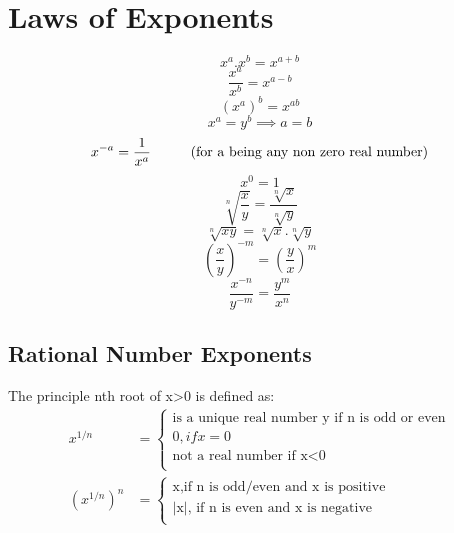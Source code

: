 \section{Laws of Exponents}
\begin{equation}
\label{xmn}
x^a . x^b  = x^{a+b}
\end{equation}
\begin{equation}
\label{xm/n}
\frac{x^a}{x^b}  = x^{a-b}
\end{equation}
\begin{equation}
\label{x^mn}
({x^a})^{b} = x^{ab}
\end{equation}
\begin{equation}
\label{xm_equal_xn}
x^a = y^b \implies a = b
\end{equation}
\begin{equation}
\label{xtominusn}
x^{-a} = \frac{1}{x^a} \hspace{10mm} 
\text{(for a being any non zero real number)}
\end{equation}
\begin{equation}
\label{xto0}
x^{0} = 1
\end{equation}
\begin{equation}
\label{nrootxy}
\sqrt[n]{\frac{x}{y}} = \frac{\sqrt[n]{x}}{\sqrt[n]{y}}
\end{equation}
\begin{equation}
\label{nxy}
\sqrt[n]{xy} = \sqrt[n]{x}.\sqrt[n]{y}
\end{equation}
\begin{equation}
\label{xy-m}
\left( \frac{x}{y} \right)^{-m} = \left( \frac{y}{x} \right)^{m}
\end{equation}
\begin{equation}
\label{xynm}
\frac{x^{-n}}{y^{-m}} = \frac{y^m}{x^n}
\end{equation}

\subsection{Rational Number Exponents}
The principle nth root of x>0 is defined as: \\
\begin{align*}
x^{1/n} &= 
\begin{cases}
\text{is a unique real number y if n is odd or even} \\
0, if x = 0 \\
\text{not a real number if x<0}\\
\end{cases}
\\
(x^{1/n})^{n} &= 
\begin{cases}
\text{x,if n is odd/even and x is positive} \\
\text{|x|, if n is even and x is negative}\\
\end{cases}
\end{align*}

